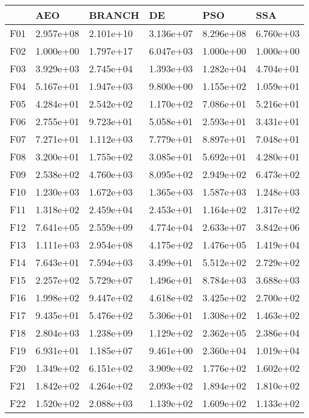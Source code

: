 \begin{tabular}{llllll}
\toprule
{} &        AEO &     BRANCH &         DE &        PSO &        SSA \\
\midrule
F01  &  2.957e+08 &  2.101e+10 &  3.136e+07 &  8.296e+08 &  6.760e+03 \\
F02  &  1.000e+00 &  1.797e+17 &  6.047e+03 &  1.000e+00 &  1.000e+00 \\
F03  &  3.929e+03 &  2.745e+04 &  1.393e+03 &  1.282e+04 &  4.704e+01 \\
F04  &  5.167e+01 &  1.947e+03 &  9.800e+00 &  1.155e+02 &  1.059e+01 \\
F05  &  4.284e+01 &  2.542e+02 &  1.170e+02 &  7.086e+01 &  5.216e+01 \\
F06  &  2.755e+01 &  9.723e+01 &  5.058e+01 &  2.593e+01 &  3.431e+01 \\
F07  &  7.271e+01 &  1.112e+03 &  7.779e+01 &  8.897e+01 &  7.048e+01 \\
F08  &  3.200e+01 &  1.755e+02 &  3.085e+01 &  5.692e+01 &  4.280e+01 \\
F09  &  2.538e+02 &  4.760e+03 &  8.095e+02 &  2.949e+02 &  6.473e+02 \\
F10  &  1.230e+03 &  1.672e+03 &  1.365e+03 &  1.587e+03 &  1.248e+03 \\
F11  &  1.318e+02 &  2.459e+04 &  2.453e+01 &  1.164e+02 &  1.317e+02 \\
F12  &  7.641e+05 &  2.559e+09 &  4.774e+04 &  2.633e+07 &  3.842e+06 \\
F13  &  1.111e+03 &  2.954e+08 &  4.175e+02 &  1.476e+05 &  1.419e+04 \\
F14  &  7.643e+01 &  7.594e+03 &  3.499e+01 &  5.512e+02 &  2.729e+02 \\
F15  &  2.257e+02 &  5.729e+07 &  1.496e+01 &  8.784e+03 &  3.688e+03 \\
F16  &  1.998e+02 &  9.447e+02 &  4.618e+02 &  3.425e+02 &  2.700e+02 \\
F17  &  9.435e+01 &  5.476e+02 &  5.306e+01 &  1.308e+02 &  1.463e+02 \\
F18  &  2.804e+03 &  1.238e+09 &  1.129e+02 &  2.362e+05 &  2.386e+04 \\
F19  &  6.931e+01 &  1.185e+07 &  9.461e+00 &  2.360e+04 &  1.019e+04 \\
F20  &  1.349e+02 &  6.151e+02 &  3.909e+02 &  1.776e+02 &  1.602e+02 \\
F21  &  1.842e+02 &  4.264e+02 &  2.093e+02 &  1.894e+02 &  1.810e+02 \\
F22  &  1.520e+02 &  2.088e+03 &  1.139e+02 &  1.609e+02 &  1.133e+02 \\

\end{tabular}
